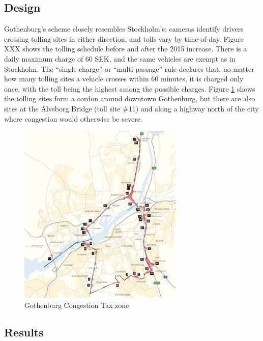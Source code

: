 \subsection{Design}

Gothenburg's scheme closely resembles Stockholm's: cameras identify drivers crossing tolling sites in either direction, and tolls vary by time-of-day. Figure XXX shows the tolling schedule before and after the 2015 increase. There is a daily maximum charge of 60 SEK, and the same vehicles are exempt as in Stockholm. The ``single charge'' or  ``multi-passage'' rule declares that, no matter how many tolling sites a vehicle crosses within 60 minutes, it is charged only once, with the toll being the highest among the possible charges. Figure \ref{fig:Gothenburg-map} shows the tolling sites form a cordon around downtown Gothenburg, but there are also sites at the \"Alvsborg Bridge (toll site \#11) and along a highway north of the city where congestion would otherwise be severe. 

\begin{figure}[ht]
\includegraphics[width=0.7\textwidth]{../img/gburg-map.png}

\caption{Gothenburg Congestion Tax zone \citep{transportstyrelsen2015}\label{fig:Gothenburg-map}}
\end{figure}

\subsection{Results}

